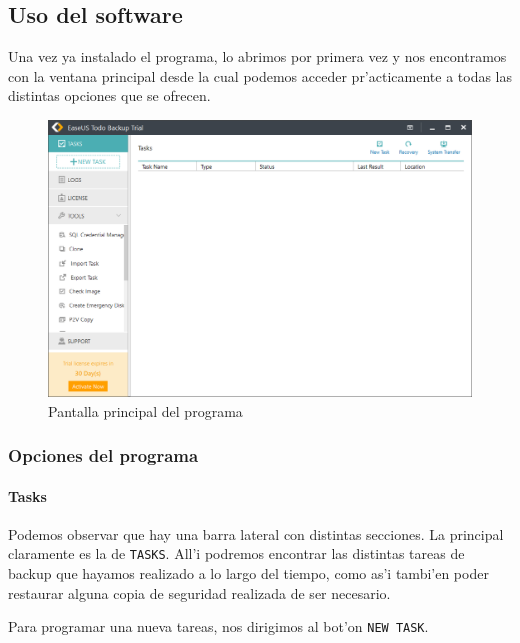 \documentclass[11pt]{article}
\begin{document}
		\subsection{Uso del software}
		
		Una vez ya instalado el programa, lo abrimos por primera vez y nos encontramos con la ventana principal desde la cual podemos acceder pr'acticamente a todas las distintas opciones que se ofrecen.
		
		\begin{figure}[H]
			\centering
			\includegraphics[width=.8\textwidth]{Images/easeus/use_main}
			\caption{Pantalla principal del programa}
		\end{figure}
	
		\subsubsection{Opciones del programa}
		
		\paragraph{Tasks}
	
		Podemos observar que hay una barra lateral con distintas secciones. La principal claramente es la de \texttt{TASKS}. All'i podremos encontrar las distintas tareas de backup que hayamos realizado a lo largo del tiempo, como as'i tambi'en poder restaurar alguna copia de seguridad realizada de ser necesario.
		
		Para programar una nueva tareas, nos dirigimos al bot'on \texttt{NEW TASK}.
		
\end{document}
